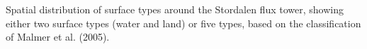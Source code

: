\label{fig:r_u5} Spatial distribution of surface types around
the Stordalen flux tower, showing either two surface types (water and
land) or five types, based on the classification of Malmer et al.
(2005).